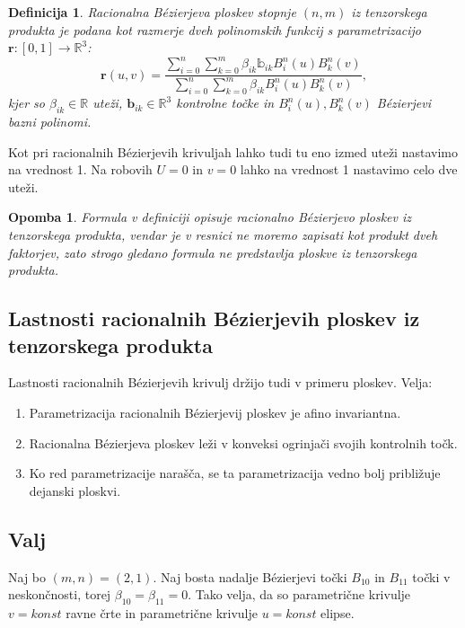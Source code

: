 \documentclass[a4paper,10pt]{article}
\newtheorem{definicija}{Definicija}
\newtheorem{opomba}{Opomba}
\begin{document}
\begin{definicija}
    Racionalna Bézierjeva ploskev stopnje $(n, m)$ iz tenzorskega produkta je podana kot razmerje dveh polinomskih funkcij s parametrizacijo $\mathbf{r}: [0,1] \rightarrow \mathbb{R}^3$:
    $$
    \mathbf{r} (u, v) = \frac{ \sum_{i=0}^{n} \sum_{k=0}^{m} \beta_{ik} \mathbb{b}_{ik} B_i^{n} (u) B_k^{n} (v) }{ \sum_{i=0}^{n} \sum_{k=0}^{m} \beta_{ik} B_i^{n} (u) B_k^{n} (v) } ,
    $$
    kjer so $\beta_{ik} \in \mathbb{R}$ uteži, $\mathbf{b}_{ik} \in \mathbb{R}^3$ kontrolne točke in $B_i^{n} (u), B_k^{n} (v)$ Bézierjevi bazni polinomi.
\end{definicija}

Kot pri racionalnih Bézierjevih krivuljah lahko tudi tu eno izmed uteži nastavimo na vrednost 1. Na robovih $U=0$ in $v=0$ lahko na vrednost 1 nastavimo celo dve uteži. %

\begin{opomba}
    Formula v definiciji opisuje racionalno Bézierjevo ploskev iz tenzorskega produkta, vendar je v resnici ne moremo zapisati kot produkt dveh faktorjev, zato strogo gledano formula ne predstavlja ploskve iz tenzorskega produkta.
\end{opomba}

\subsection{Lastnosti racionalnih Bézierjevih ploskev iz tenzorskega produkta}

Lastnosti racionalnih Bézierjevih krivulj držijo tudi v primeru ploskev. Velja:

\begin{enumerate}
    \item Parametrizacija racionalnih Bézierjevij ploskev je afino invariantna.
    \item Racionalna Bézierjeva ploskev leži v konveksi ogrinjači svojih kontrolnih točk.
    \item Ko red parametrizacije narašča, se ta parametrizacija vedno bolj približuje dejanski ploskvi.
\end{enumerate}

\subsection{Valj}

Naj bo $(m, n) = (2, 1)$. Naj bosta nadalje Bézierjevi točki $B_{10}$ in $B_{11}$ točki v neskončnosti, torej $\beta_{10} = \beta_{11} = 0$. Tako velja, da so parametrične krivulje $v = konst$ ravne črte in parametrične krivulje $u = konst$ elipse. 
\end{document}
